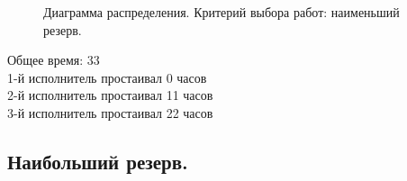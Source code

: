 \documentclass[a4paper,14pt]{extarticle}
\begin{document}
\begin{figure}[H]
\caption{Диаграмма распределения. Критерий выбора работ: наименьший резерв.}
\label{ris:image}
\end{figure}

Общее время: 33 \\
1-й исполнитель простаивал 0 часов\\
2-й исполнитель простаивал 11 часов \\
3-й исполнитель простаивал 22 часов \\


\subsection{Наибольший резерв.}
\end{document}
